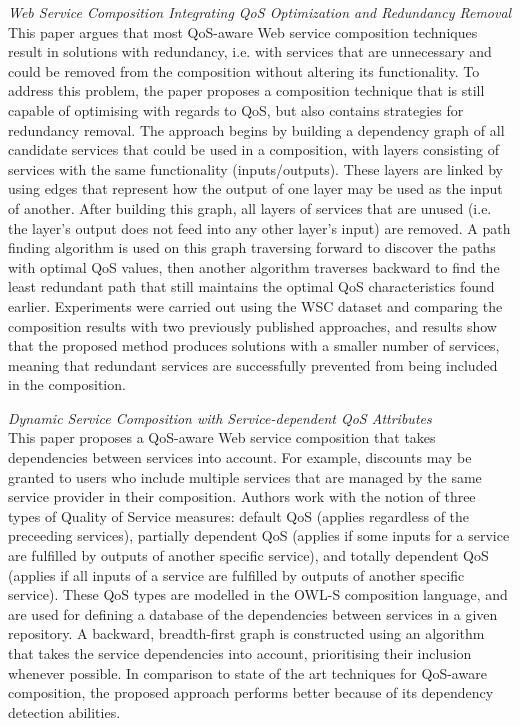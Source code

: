 \textit{Web Service Composition Integrating QoS Optimization and Redundancy Removal \cite{xia2013web}}\\
This paper argues that most QoS-aware Web service composition techniques result in solutions with redundancy, i.e. with services
that are unnecessary and could be removed from the composition without altering its functionality. To address this problem, the paper
proposes a composition technique that is still capable of optimising with regards to QoS, but also contains strategies for redundancy
removal. The approach begins by building a dependency graph of all candidate services that could be used in a composition, with layers
consisting of services with the same functionality (inputs/outputs). These layers are linked by using edges that represent how the output
of one layer may be used as the input of another. After building this graph, all layers of services that are unused (i.e. the layer's output
does not feed into any other layer's input) are removed. A path finding algorithm is used on this graph traversing forward to discover the
paths with optimal QoS values, then another algorithm traverses backward to find the least redundant path that still maintains the optimal
QoS characteristics found earlier. Experiments were carried out using the WSC dataset and comparing the composition results with two previously
published approaches, and results show that the proposed method produces solutions with a smaller number of services, meaning that redundant
services are successfully prevented from being included in the composition.

\textit{Dynamic Service Composition with Service-dependent QoS Attributes \cite{feng2013dynamic}}\\
This paper proposes a QoS-aware Web service composition that takes dependencies between services into account. For example, discounts may be granted to users
who include multiple services that are managed by the same service provider in their composition. Authors work with the notion of three types of Quality of Service
measures: default QoS (applies regardless of the preceeding services), partially dependent QoS (applies if some inputs for a service are fulfilled by outputs
of another specific service), and totally dependent QoS (applies if all inputs of a service are fulfilled by outputs of another specific service). These QoS types
are modelled in the OWL-S composition language, and are used for defining a database of the dependencies between services in a given repository. A backward,
breadth-first graph is constructed using an algorithm that takes the service dependencies into account, prioritising their inclusion whenever possible. In comparison
to state of the art techniques for QoS-aware composition, the proposed approach performs better because of its dependency detection abilities.


